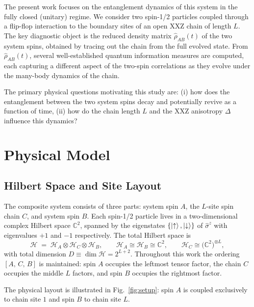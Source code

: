 \documentclass[12pt,a4paper]{article}
\newcommand{\rhohat}{\hat{\rho}}
\newcommand{\Hilb}{\mathcal{H}}
\newcommand{\sigz}{\hat{\sigma}^z}
\newcommand{\uparr}{\uparrow}
\newcommand{\downarr}{\downarrow}
\begin{document}
The present work focuses on the entanglement dynamics of this system in the
fully closed (unitary) regime.  We consider two spin-1/2 particles coupled
through a flip-flop interaction to the boundary sites of an open XXZ chain of
length $L$.  The key diagnostic object is the reduced density matrix
$\rhohat_{AB}(t)$ of the two system spins, obtained by tracing out the chain
from the full evolved state.  From $\rhohat_{AB}(t)$, several well-established
quantum information measures are computed, each capturing a different aspect of
the two-spin correlations as they evolve under the many-body dynamics of the
chain.

The primary physical questions motivating this study are: (i) how does the
entanglement between the two system spins decay and potentially revive as a
function of time, (ii) how do the chain length $L$ and the XXZ anisotropy
$\Delta$ influence this dynamics?

\section{Physical Model}
\label{sec:model}

\subsection{Hilbert Space and Site Layout}
\label{subsec:hilbert}

The composite system consists of three parts: system spin $A$, the $L$-site spin
chain $C$, and system spin $B$.  Each spin-1/2 particle lives in a two-dimensional
complex Hilbert space $\mathbb{C}^2$, spanned by the eigenstates
$\{\ket{\uparr},\ket{\downarr}\}$ of $\sigz$ with eigenvalues $+1$ and $-1$
respectively.  The total Hilbert space is
\begin{equation}
  \Hilb \;=\; \Hilb_A \otimes \Hilb_C \otimes \Hilb_B,
  \qquad \Hilb_A \cong \Hilb_B \cong \mathbb{C}^2,
  \qquad \Hilb_C \cong \bigl(\mathbb{C}^2\bigr)^{\otimes L},
  \label{eq:hilbert}
\end{equation}
with total dimension $D \equiv \dim\Hilb = 2^{L+2}$.  Throughout this work the
ordering $[A,\, C,\, B]$ is maintained: spin $A$ occupies the leftmost tensor
factor, the chain $C$ occupies the middle $L$ factors, and spin $B$ occupies
the rightmost factor.

The physical layout is illustrated in Fig.~\ref{fig:setup}: spin $A$ is coupled
exclusively to chain site $1$ and spin $B$ to chain site $L$.
\end{document}
